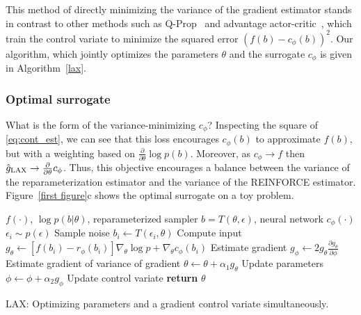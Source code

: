 \documentclass{article}
\newcommand{\PT}{\frac{\partial}{\partial \theta}}
\newcommand{\LAX}{{\textnormal{LAX}}}
\newcommand{\RELAX}{{\textnormal{RELAX}}}
\begin{document}
This method of directly minimizing the variance of the gradient estimator stands in contrast to other methods such as Q-Prop~\citep{gu2016q} and advantage actor-critic~\citep{mnih2016asynchronous}, which train the control variate to minimize the squared error $(f(b) - c_\phi(b))^2$.
Our algorithm, which jointly optimizes the parameters $\theta$ and the surrogate $c_\phi$ is given in Algorithm~\ref{lax}.

\subsubsection{Optimal surrogate}
What is the form of the variance-minimizing $c_\phi$?
Inspecting the square of \eqref{eq:cont_est}, we can see that this loss encourages $c_\phi(b)$ to approximate $f(b)$, but with a weighting based on $\PT\log p(b)$.  %
Moreover, as $c_\phi \rightarrow f$ then $\hat g_\textnormal{\LAX} \rightarrow \PT c_\phi$.
Thus, this objective encourages a balance between the variance of the reparameterization estimator and the variance of the REINFORCE estimator.
Figure~\ref{first figure}c shows the optimal surrogate on a toy problem.


\begin{algorithm}[h]
\begin{algorithmic}
\Require $f(\cdot)$, $\log p(b|\theta)$, reparameterized sampler $b = T(\theta, \epsilon)$, neural network $c_\phi(\cdot)$
	\State $\epsilon_{i} \sim p(\epsilon)$ \Comment Sample noise
	\State $b_i \leftarrow T(\epsilon_i, \theta)$ \Comment Compute input
	\State  $g_\theta \leftarrow \left[f(b_i) - r_{\phi}(b_i) \right] \nabla_\theta \log p + \nabla_\theta c_\phi(b_i)$ \Comment Estimate gradient
	\State  $g_\phi \leftarrow 2 g_\theta \frac{\partial g_\theta}{\partial \phi}$ \Comment Estimate gradient of variance of gradient
	\State $\theta \leftarrow \theta + \alpha_1 g_\theta$ \Comment Update parameters
	\State $\phi \leftarrow \phi + \alpha_2 g_\phi$ \Comment Update control variate
\EndWhile
\State \textbf{return} $\theta$ 
\end{algorithmic}
\caption{\LAX{}: Optimizing parameters and a gradient control variate simultaneously.}
\label{lax}
\end{algorithm}

\end{document}
